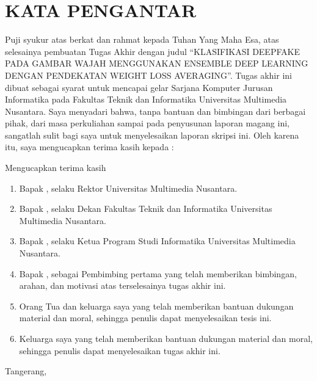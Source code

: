 \chapter*{KATA PENGANTAR}
Puji syukur atas berkat dan rahmat kepada Tuhan Yang Maha Esa, atas selesainya pembuatan Tugas Akhir dengan judul “KLASIFIKASI DEEPFAKE PADA GAMBAR WAJAH MENGGUNAKAN
ENSEMBLE DEEP LEARNING DENGAN PENDEKATAN WEIGHT LOSS
AVERAGING”. Tugas akhir ini dibuat sebagai syarat untuk mencapai gelar Sarjana Komputer
Jurusan Informatika pada Fakultas Teknik dan Informatika Universitas Multimedia Nusantara. Saya menyadari bahwa, tanpa bantuan dan bimbingan dari berbagai pihak, dari masa perkuliahan sampai pada penyusunan laporan magang ini, sangatlah sulit bagi saya untuk menyelesaikan laporan skripsi ini. Oleh karena itu, saya mengucapkan terima kasih kepada :

\noindent Mengucapkan terima kasih
\begin{enumerate}
	\item Bapak \rektorUMN, selaku Rektor Universitas Multimedia
Nusantara. 
	\item Bapak \dekanFTI, selaku Dekan Fakultas Teknik dan
Informatika Universitas Multimedia Nusantara.
	\item Bapak \kaprodi, selaku Ketua Program Studi
Informatika Universitas Multimedia Nusantara. 
	\item Bapak \pembimbing,  sebagai Pembimbing pertama yang telah memberikan bimbingan, arahan, dan motivasi atas terselesainya tugas akhir ini.
\item Orang Tua dan keluarga saya yang telah memberikan bantuan dukungan material dan moral, sehingga penulis dapat menyelesaikan tesis ini.
\item Keluarga saya yang telah memberikan bantuan dukungan material dan moral, sehingga penulis dapat menyelesaikan tugas akhir ini. 
\end{enumerate}

\vspace*{0.1cm}

\begin{flushright}
Tangerang, \tanggalPengumpulan \\[0.1cm]
\vspace*{2cm}
\penulis
\end{flushright}